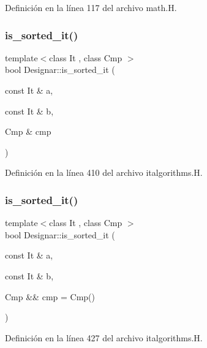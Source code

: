 Definición en la línea 117 del archivo math.\+H.

\mbox{\label{namespace_designar_a2f33378e3e21b1dda9bbfa0c5537c174}} 
\subsubsection{\texorpdfstring{is\+\_\+sorted\+\_\+it()}{is\_sorted\_it()}\hspace{0.1cm}{\footnotesize\ttfamily [1/2]}}
{\footnotesize\ttfamily template$<$class It , class Cmp $>$ \\
bool Designar\+::is\+\_\+sorted\+\_\+it (\begin{DoxyParamCaption}\item[{const It \&}]{a,  }\item[{const It \&}]{b,  }\item[{Cmp \&}]{cmp }\end{DoxyParamCaption})}



Definición en la línea 410 del archivo italgorithms.\+H.

\mbox{\label{namespace_designar_a201bc6cc5dcc9525bc150e658a81ddbc}} 
\subsubsection{\texorpdfstring{is\+\_\+sorted\+\_\+it()}{is\_sorted\_it()}\hspace{0.1cm}{\footnotesize\ttfamily [2/2]}}
{\footnotesize\ttfamily template$<$class It , class Cmp $>$ \\
bool Designar\+::is\+\_\+sorted\+\_\+it (\begin{DoxyParamCaption}\item[{const It \&}]{a,  }\item[{const It \&}]{b,  }\item[{Cmp \&\&}]{cmp = {\ttfamily Cmp()} }\end{DoxyParamCaption})}



Definición en la línea 427 del archivo italgorithms.\+H.

